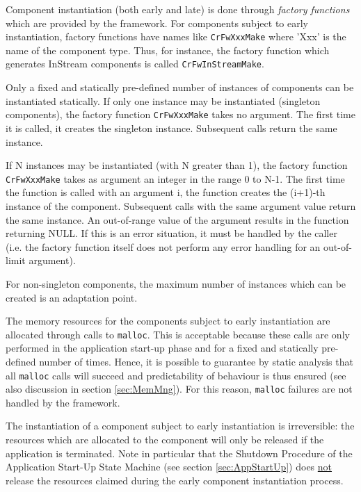\documentclass{pnp_article}
\begin{document}
Component instantiation (both early and late) is done through \textit{factory functions} which are provided by the framework. For components subject to early instantiation, factory functions have names like \texttt{CrFwXxxMake} where 'Xxx' is the name of the component type. Thus, for instance, the factory function which generates InStream components is called \texttt{CrFwInStreamMake}.  

Only a fixed and statically pre-defined number of instances of components can be instantiated statically. If only one instance may be instantiated (singleton components), the factory function \texttt{CrFwXxxMake} takes no argument. The first time it is called, it creates the singleton instance. Subsequent calls return the same instance.

If N instances may be instantiated (with N greater than 1), the factory function \texttt{CrFwXxxMake} takes as argument an integer in the range 0 to N-1. The first time the function is called with an argument i, the function creates the (i+1)-th instance of the component. Subsequent calls with the same argument value return the same instance. An out-of-range value of the argument results in the function returning NULL. If this is an error situation, it must be handled by the caller (i.e. the factory function itself does not perform any error handling for an out-of-limit argument).

For non-singleton components, the maximum number of instances which can be created is an adaptation point.

The memory resources for the components subject to early instantiation are allocated through calls to \texttt{malloc}. This is acceptable because these calls are only performed in the application start-up phase and for a fixed and statically pre-defined number of times. Hence, it is possible to guarantee by static analysis that all \texttt{malloc} calls will succeed and predictability of behaviour is thus ensured (see also discussion in section \ref{sec:MemMng}). For this reason, \texttt{malloc} failures are not handled by the framework.

The instantiation of a component subject to early instantiation is irreversible: the resources which are allocated to the component will only be released if the application is terminated. Note in particular that the Shutdown Procedure of the Application Start-Up State Machine (see section \ref{sec:AppStartUp}) does \underline{not} release the resources claimed during the early component instantiation process. 
\end{document}
